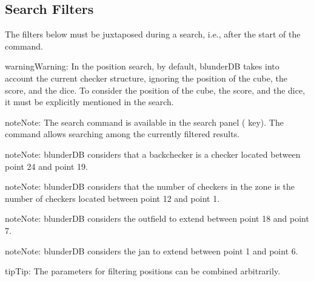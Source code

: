 \documentclass[letterpaper,10pt,english]{sphinxmanual}
\begin{document}
\subsection{Search Filters}
\label{\detokenize{cmd_mode:filtres-de-recherche}}\label{\detokenize{cmd_mode:cmd-filter}}
\sphinxAtStartPar
The filters below must be juxtaposed during a search, i.e., after the start of the  command.

\label{\detokenize{cmd_mode:cmd-filter-pos}}
\begin{sphinxadmonition}{warning}{Warning:}
\sphinxAtStartPar
In the position search, by default, blunderDB takes into account the current checker structure, ignoring the position of the cube, the score, and the dice. To consider the position of the cube, the score, and the dice, it must be explicitly mentioned in the search.
\end{sphinxadmonition}

\begin{sphinxadmonition}{note}{Note:}
\sphinxAtStartPar
The search command  is available in the search panel ( key). The  command allows searching among the currently filtered results.
\end{sphinxadmonition}

\begin{sphinxadmonition}{note}{Note:}
\sphinxAtStartPar
blunderDB considers that a backchecker is a checker located between point 24 and point 19.
\end{sphinxadmonition}

\begin{sphinxadmonition}{note}{Note:}
\sphinxAtStartPar
blunderDB considers that the number of checkers in the zone is the number of checkers located between point 12 and point 1.
\end{sphinxadmonition}

\begin{sphinxadmonition}{note}{Note:}
\sphinxAtStartPar
blunderDB considers the outfield to extend between point 18 and point 7.
\end{sphinxadmonition}

\begin{sphinxadmonition}{note}{Note:}
\sphinxAtStartPar
blunderDB considers the jan to extend between point 1 and point 6.
\end{sphinxadmonition}

\begin{sphinxadmonition}{tip}{Tip:}
\sphinxAtStartPar
The parameters for filtering positions can be combined arbitrarily.
\end{sphinxadmonition}
\end{document}
